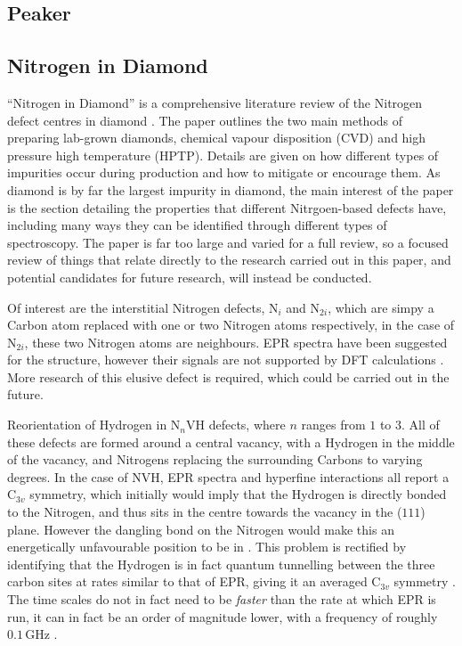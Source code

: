 \documentclass[10pt,a4paper,twocolumn,twoside]{extarticle}
\begin{document}
\subsection{Peaker}

\subsection{Nitrogen in Diamond}
``Nitrogen in Diamond'' is a comprehensive literature review of the Nitrogen defect centres in diamond \cite{NitrogeninDiamond}. 
The paper outlines the two main methods of preparing lab-grown diamonds, chemical vapour disposition (CVD) and high pressure high temperature (HPTP). Details are given on how different types of impurities occur during production and how to mitigate or encourage them. As diamond is by far the largest impurity in diamond, the main interest of the paper is the section detailing the properties that different Nitrgoen-based defects have, including many ways they can be identified through different types of spectroscopy. The paper is far too large and varied for a full review, so a focused review of things that relate directly to the research carried out in this paper, and potential candidates for future research, will instead be conducted. 

Of interest are the interstitial Nitrogen defects, N$_i$ and N$_{2i}$, which are simpy a Carbon atom replaced with one or two Nitrogen atoms respectively, in the case of N$_{2i}$, these two Nitrogen atoms are neighbours. EPR spectra have been suggested for the structure, however their signals are not supported by DFT calculations \cite{Atumi_2013}. More research of this elusive defect is required, which could be carried out in the future.

Reorientation of Hydrogen in N$_n$VH defects, where $n$ ranges from $1$ to $3$. All of these defects are formed around a central vacancy, with a Hydrogen in the middle of the vacancy, and Nitrogens replacing the surrounding Carbons to varying degrees. In the case of NVH, EPR spectra and hyperfine interactions all report a C$_{3v}$ symmetry, which initially would imply that the Hydrogen is directly bonded to the Nitrogen, and thus sits in the centre towards the vacancy in the ($1 1 1$) plane. However the dangling bond on the Nitrogen would make this an energetically unfavourable position to be in \cite{Goss_NVH}. This problem is rectified by identifying that the Hydrogen is in fact quantum tunnelling between the three carbon sites at rates similar to that of EPR, giving it an averaged C$_{3v}$ symmetry \cite{Shaw_QT_VH}. The time scales do not in fact need to be \emph{faster} than the rate at which EPR is run, it can in fact be an order of magnitude lower, with a frequency of roughly $0.1$\,GHz \cite{Edwards_N2VH_rate}.
\end{document}
